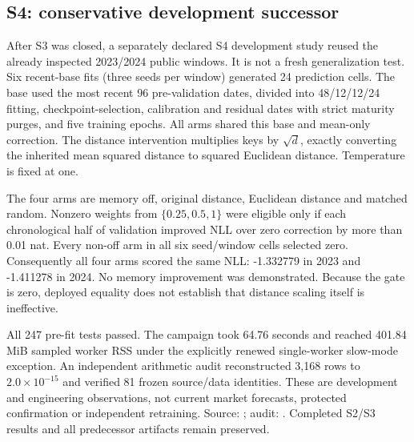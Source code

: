 \subsection{S4: conservative development successor}
After S3 was closed, a separately declared S4 development study reused the already inspected 2023/2024 public windows. It is not a fresh generalization test. Six recent-base fits (three seeds per window) generated 24 prediction cells. The base used the most recent 96 pre-validation dates, divided into 48/12/12/24 fitting, checkpoint-selection, calibration and residual dates with strict maturity purges, and five training epochs. All arms shared this base and mean-only correction. The distance intervention multiplies keys by $\sqrt{d}$, exactly converting the inherited mean squared distance to squared Euclidean distance. Temperature is fixed at one.

The four arms are memory off, original distance, Euclidean distance and matched random. Nonzero weights from $\{0.25,0.5,1\}$ were eligible only if each chronological half of validation improved NLL over zero correction by more than 0.01 nat. Every non-off arm in all six seed/window cells selected zero. Consequently all four arms scored the same NLL: -1.332779 in 2023 and -1.411278 in 2024. No memory improvement was demonstrated. Because the gate is zero, deployed equality does not establish that distance scaling itself is ineffective.

All 247 pre-fit tests passed. The campaign took 64.76 seconds and reached 401.84 MiB sampled worker RSS under the explicitly renewed single-worker slow-mode exception. An independent arithmetic audit reconstructed 3,168 rows to $2.0\times10^{-15}$ and verified 81 frozen source/data identities. These are development and engineering observations, not current market forecasts, protected confirmation or independent retraining. Source: ; audit: . Completed S2/S3 results and all predecessor artifacts remain preserved.
